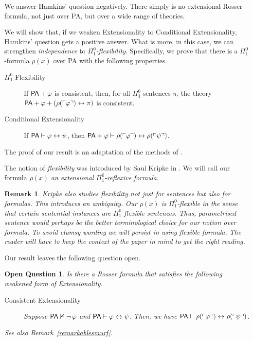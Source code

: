 \documentclass{amsart}
\newcommand{\qee} {\hspace*{2mm}\hfill \ding{109}}
\renewcommand{\iff}{\leftrightarrow}
\renewcommand{\phi}{\varphi}
\newtheorem{ques}[theorem]{Open Question}
\newenvironment{question}{\begin{ques} \rm}{\qee\end{ques}}
\newtheorem{rem}[theorem]{Remark}
\newenvironment{remark}{\begin{rem} \rm}{\qee\end{rem}}
\newcommand{\gnum}[1]{{\ulcorner #1 \urcorner}}
\begin{document}
We answer Hamkins' question negatively. There simply is no extensional Rosser formula, not just over {\sf PA},
but over a wide range of theories.

We will show that, if we weaken Extensionality to Conditional Extensionality, Hamkins' question gets a positive
answer. What is more, in this case, we can strengthen \emph{independence} to \emph{$\Pi^0_1$-flexibility}. Specifically, we prove
that there is a $\Pi^0_1$-formula $\rho(x)$ over {\sf PA} with the following properties.
\begin{description}
\item[$\Pi^0_1$-Flexibility] If ${\sf PA}+ \phi$ is consistent, then, for all $\Pi^0_1$-sentences $\pi$, the theory ${\sf PA}+ \phi+(\rho(\gnum\phi)\iff \pi)$ is
consistent.
\item[Conditional Extensionality] If ${\sf PA} \vdash \phi \iff \psi$, then $ {\sf PA}+ \phi \vdash\rho(\gnum \phi) \iff \rho(\gnum\psi)$.
\end{description}

\noindent
The proof of our result is an adaptation of the methods of \cite{viss:abso21}.

The notion of \emph{flexibility} was introduced by Saul Kripke in \cite{krip:flex62}. 
 We will call our formula $\rho(x)$ \emph{an extensional $\Pi^0_1$-reflexive formula}. 
 
 \begin{remark}{\footnotesize
 Kripke also studies flexibility not just for sentences but also
for formulas. This introduces an ambiguity. Our $\rho(x)$ is $\Pi^0_1$-flexible in
the sense that certain  sentential instances are $\Pi^0_1$-flexible sentences. Thus,
 \emph{parametrised sentence} would perhaps
be the better terminological choice for our notion over \emph{formula}. To avoid clumsy wording
we will persist in using \emph{flexible formula}. The reader will have to keep the context of the paper
in mind to get the right reading.}
\end{remark}
 
 Our result leaves the following question open.
 
 \begin{question}\label{vragendesmurf}
 Is there a Rosser formula that satisfies the following weakened form of Extensionality.
 
 \begin{description}
 \item[Consistent Extensionality]
 Suppose ${\sf PA}\nvdash \neg\, \phi$ and ${\sf PA} \vdash \phi\iff \psi$.
 Then, we have ${\sf PA}\vdash \rho(\gnum\phi) \iff \rho(\gnum\psi)$.
 \end{description}
 See also Remark~\ref{remarkablesmurf}.
 \end{question}
 
\end{document}
